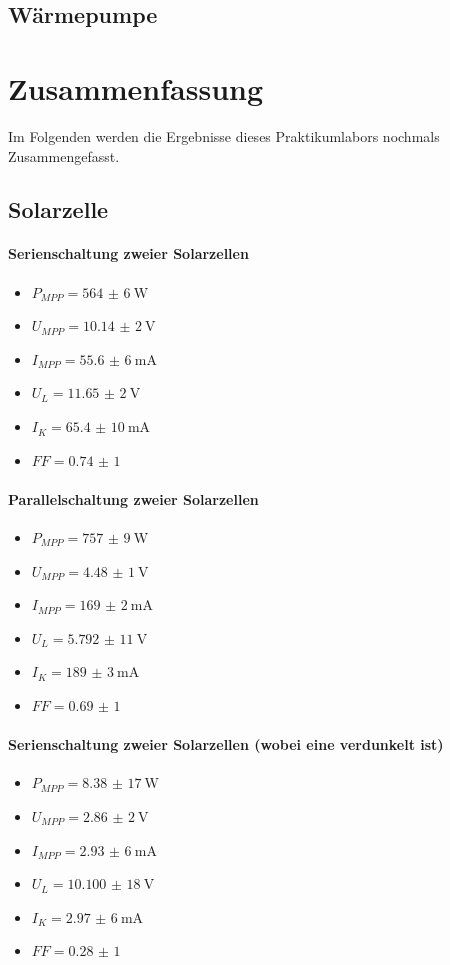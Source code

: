 \documentclass[english, ngerman]{scrartcl}
\begin{document}
\subsection{Wärmepumpe}
\label{subsec:diskussion_waermepumpe}


\section{Zusammenfassung}
\label{sec:zusammenfassung}
Im Folgenden werden die Ergebnisse dieses Praktikumlabors nochmals Zusammengefasst.
\subsection{Solarzelle}
\label{subsec:zusammenfassung_solar}
\paragraph{Serienschaltung zweier Solarzellen}
\begin{itemize}
    \item $P_{MPP} = \SI{564(6)}{\watt}$
    \item $U_{MPP} = \SI{10,14(2)}{\volt}$
    \item $I_{MPP} = \SI{55,6(6)}{\milli\ampere}$
    \item $U_{L} = \SI{11,65(2)}{\volt}$
    \item $I_{K} = \SI{65,4(10)}{\milli\ampere}$
    \item $FF = \num{0,74(1)}$
\end{itemize}
\paragraph{Parallelschaltung zweier Solarzellen}
\begin{itemize}
    \item $P_{MPP} = \SI{757(9)}{\watt}$
    \item $U_{MPP} = \SI{4,48(1)}{\volt}$
    \item $I_{MPP} = \SI{169(2)}{\milli\ampere}$
    \item $U_{L} = \SI{5,792(11)}{\volt}$
    \item $I_{K} = \SI{189(3)}{\milli\ampere}$
    \item $FF = \num{0,69(1)}$
\end{itemize}
\paragraph{Serienschaltung zweier Solarzellen (wobei eine verdunkelt ist)}
\begin{itemize}
    \item $P_{MPP} = \SI{8,38(17)}{\watt}$
    \item $U_{MPP} = \SI{2,86(2)}{\volt}$
    \item $I_{MPP} = \SI{2,93(6)}{\milli\ampere}$
    \item $U_{L} = \SI{10,100(18)}{\volt}$
    \item $I_{K} = \SI{2,97(6)}{\milli\ampere}$
    \item $FF = \num{0,28(1)}$
\end{itemize}
\end{document}
